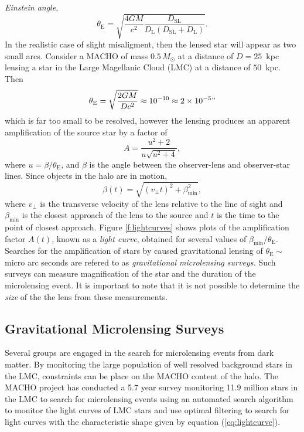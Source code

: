 \emph{Einstein angle},
\begin{equation}
\theta_\mathrm{E} = \sqrt{\frac{4GM}{c^2} \frac{D_\mathrm{SL}}
{D_\mathrm{L}\left(D_\mathrm{SL} + D_\mathrm{L}\right)}}.
\end{equation}
In the realistic case of slight misaligment, then the lensed star will appear
as two small arcs. Consider a MACHO of mass $0.5\,M_\odot$ at a distance of $D
= 25$~kpc lensing a star in the Large Magellanic Cloud (LMC) at a distance of
$50$~kpc. Then
\begin{equation}
\theta_\mathrm{E} = \sqrt{\frac{2GM}{Dc^2}} \approx 10^{-10} \approx 2 \times
10^{-5}"
\end{equation}
which is far too small to be resolved, however the lensing produces an
apparent amplification of the source star\cite{1964MNRAS.128..295R} by a
factor of
\begin{equation}
A = \frac{u^2 + 2}{u\sqrt{u^2 + 4}},
\label{eq:lightcurve}
\end{equation}
where $u = \beta / \theta_\mathrm{E}$, and $\beta$ is the angle between the
observer-lens and observer-star lines. Since objects in the halo are in
motion,
\begin{equation}
\beta(t) = \sqrt{ (v_\perp t)^2 + \beta_\mathrm{min}^2 },
\end{equation}
where $v_\perp$ is the transverse velocity of the lens relative to the 
line of sight and $\beta_\mathrm{min}$ is the closest approach of the lens to
the source and $t$ is the time to the point of closest
approach\cite{Paczynski:1985jf,Griest:1990vu}. Figure \ref{f:lightcurves}
shows plots of the amplification factor $A(t)$, known as a \emph{light curve},
obtained for several values of $\beta_\mathrm{min} / \theta_\mathrm{E}$.
Searches for the amplification of stars by caused gravitational lensing of
$\theta_\mathrm{E} \sim $ micro arc seconds are refered to as
\emph{gravitational microlensing surveys.} Such surveys can measure
magnification of the star and the duration of the microlensing event. It is
important to note that it is not possible to determine the \emph{size} of the
the lens from these measurements.

\subsection{Gravitational Microlensing Surveys}

Several groups are engaged in the search for microlensing events from dark
matter\cite{Alcock:2000ph,Afonso:2002xq}. By monitoring the large population of
well resolved background stars in the LMC, constraints can be place on the
MACHO content of the halo. The MACHO project has conducted a 5.7 year survey
monitoring 11.9 million stars in the LMC to search for microlensing
events\cite{Alcock:2000ph} using an automated search algorithm to monitor the
light curves of LMC stars and use optimal filtering to search for light curves
with the characteristic shape given by equation (\ref{eq:lightcurve}).

